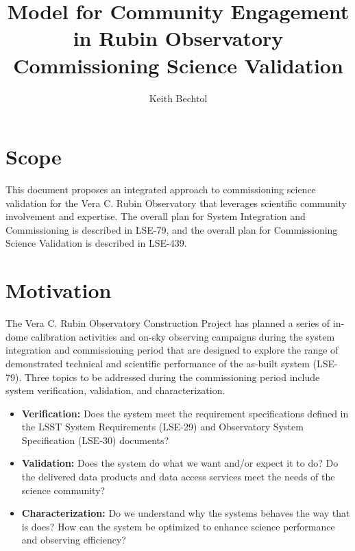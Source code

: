\documentclass[SE,authoryear,toc]{lsstdoc}
\title{Model for Community Engagement in Rubin Observatory Commissioning Science Validation}
\author{%
Keith Bechtol
}
\date{\vcsDate}
\begin{document}
\maketitle


\section{Scope}

This document proposes an integrated approach to commissioning science validation for the Vera C. Rubin Observatory that leverages scientific community involvement and expertise.
The overall plan for System Integration and Commissioning is described in LSE-79, and the overall plan for Commissioning Science Validation is described in LSE-439. 

\section{Motivation}

The Vera C. Rubin Observatory Construction Project has planned a series of in-dome calibration activities and on-sky observing campaigns during the system integration and commissioning period that are designed to explore the range of demonstrated technical and scientific performance of the as-built system (LSE-79). Three topics to be addressed during the commissioning period include system verification, validation, and characterization.

\begin{itemize}

\item \textbf{Verification:} Does the system meet the requirement specifications defined in the LSST System Requirements (LSE-29) and Observatory System Specification (LSE-30) documents?

\item \textbf{Validation:}  Does the system do what we want and/or expect it to do? Do the delivered data products and data access services meet the needs of the science community?

\item \textbf{Characterization:} Do we understand why the systems behaves the way that is does? How can the system be optimized to enhance science performance and observing efficiency?

\end{itemize}
\end{document}

